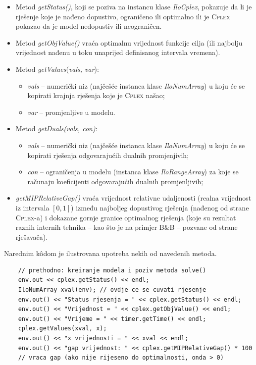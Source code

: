 \documentclass[b5paper, utf8, 11pt, colorlinks]{book}
\theoremstyle{definition}
\begin{document}
\begin{itemize}
	\item Metod \emph{getStatus()}, koji se poziva na instancu klase \emph{IloCplex},  pokazuje da li je rješenje koje je nađeno dopustivo, ograničeno ili optimalno ili je \textsc{Cplex} pokazao da je model nedopustiv ili neograničen.
	\item Metod \emph{getObjValue()} vraća optimalnu vrijednost funkcije cilja (ili najbolju vrijednost nađenu u toku unaprijed definisanog intervala vremena).
	\item Metod \emph{getValues}(\emph{vals, var}): 
	\begin{itemize}
	 	  \item \emph{vals} -- numerički niz (najčešće instanca klase \emph{IloNumArray}) u koju će se kopirati krajnja rješenja koje je \textsc{Cplex} našao;    
          \item \emph{var} -- promjenljive u modelu.
    \end{itemize}
     \item Metod \emph{getDuals(vals, con)}:
     \begin{itemize}
     	\item \emph{vals} -- numerički niz (najčešće instanca klase \emph{IloNumArray}) u koju će se kopirati rješenja odgovarajućih dualnih promjenjivih;
     	\item \emph{con} -- ograničenja u modelu (instanca klase \emph{IloRangeArray}) za koje se računaju koeficijenti odgovarajućih dualnih promjenljivih;
     	   \end{itemize}
     	\item \emph{getMIPRelativeGap()} vraća vrijednost relativne udaljenosti (realna vrijednost iz intervala $[0, 1]$) između najboljeg dopustivog rješenja (nađenog od strane \textsc{Cplex}-a) i dokazane gornje granice optimalnog rješenja (koje su rezultat raznih internih tehnika -- kao što je na primjer B\&B -- pozvane od strane rješavača).
  
\end{itemize}

Narednim k\^odom je ilustrovana upotreba nekih od navedenih metoda.
	\begin{verbatim}
	// prethodno: kreiranje modela i poziv metoda solve()
	env.out << cplex.getStatus() << endl;
	IloNumArray xval(env); // ovdje ce se cuvati rjesenje
	env.out() << "Status rjesenja = " << cplex.getStatus() << endl;
	env.out() << "Vrijednost = " << cplex.getObjValue() << endl;
	env.out() << "Vrijeme = " << timer.getTime() << endl;
	cplex.getValues(xval, x);
	env.out() << "x vrijednosti = " << xval << endl;
	env.out() << "gap vrijednost: " << cplex.getMIPRelativeGap() * 100 
	// vraca gap (ako nije rijeseno do optimalnosti, onda > 0)
\end{verbatim}
\end{document}
